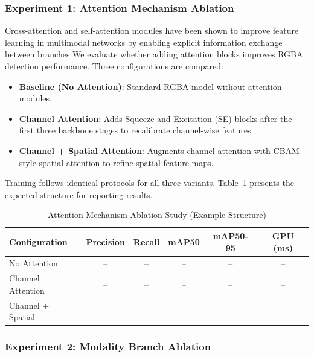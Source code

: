 \documentclass[runningheads]{llncs}
\begin{document}
\subsubsection{Experiment 1: Attention Mechanism Ablation}

Cross-attention and self-attention modules have been shown to improve feature learning in multimodal networks by enabling explicit information exchange between branches
We evaluate whether adding attention blocks improves RGBA detection performance. Three configurations are compared:

\begin{itemize}
    \item \textbf{Baseline (No Attention)}: Standard RGBA model without attention modules.
    \item \textbf{Channel Attention}: Adds Squeeze-and-Excitation (SE) blocks
    after the first three backbone stages to recalibrate channel-wise features.
    \item \textbf{Channel + Spatial Attention}: Augments channel attention with CBAM-style spatial attention to refine spatial feature maps.
\end{itemize}

Training follows identical protocols for all three variants. Table~\ref{tab:attention_ablation} presents the expected structure for reporting results.

\begin{table}[h!]
    \centering
    \caption{Attention Mechanism Ablation Study (Example Structure)}
    \label{tab:attention_ablation}
    \begin{tabular}{lccccc}
        \toprule
        \textbf{Configuration} & \textbf{Precision} & \textbf{Recall} & \textbf{mAP50} & \textbf{mAP50-95} & \textbf{GPU (ms)} \\
        \midrule
        No Attention           & -- & -- & -- & -- & -- \\
        Channel Attention      & -- & -- & -- & -- & -- \\
        Channel + Spatial      & -- & -- & -- & -- & -- \\
        \bottomrule
    \end{tabular}
\end{table}

\subsubsection{Experiment 2: Modality Branch Ablation}
\end{document}
